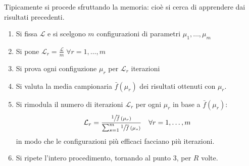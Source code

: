 \documentclass[\main/main.tex]{subfiles}
\begin{document}
\begin{observation}
    Tipicamente si procede sfruttando la memoria: cioè si cerca di apprendere dai risultati precedenti.
    \begin{enumerate}
        \item Si fissa \(\mathcal{L}\) e si scelgono \(m\) configurazioni di parametri \(\mu_1, \ldots, \mu_m\)
        \item Si pone \(\mathcal{L}_r = \frac{\mathcal{L}}{m} \; \forall r = 1, \ldots, m\)
        \item Si prova ogni configuzione \(\mu_r\) per \(\mathcal{L}_r\) iterazioni
        \item Si valuta la media campionaria \(\bar{f}(\mu_r)\) dei risultati ottenuti con \(\mu_r\).
        \item Si rimodula il numero di iterazioni \(\mathcal{L}_r\) per ogni \(\mu_r\) in base a \(\bar{f}(\mu_r)\):
        \[
            \mathcal{L}_r = \frac{\sfrac{1}{\overline{f}\left(\mu_r\right)}}{\sum_{s=1}^m \sfrac{1}{\overline{f}\left(\mu_s\right)}} \quad \forall r = 1, \ldots, m
        \]
        in modo che le configurazioni più efficaci facciano più iterazioni.
        \item Si ripete l'intero procedimento, tornando al punto 3, per \(R\) volte.
    \end{enumerate}
\end{observation}
\clearpage
\end{document}
